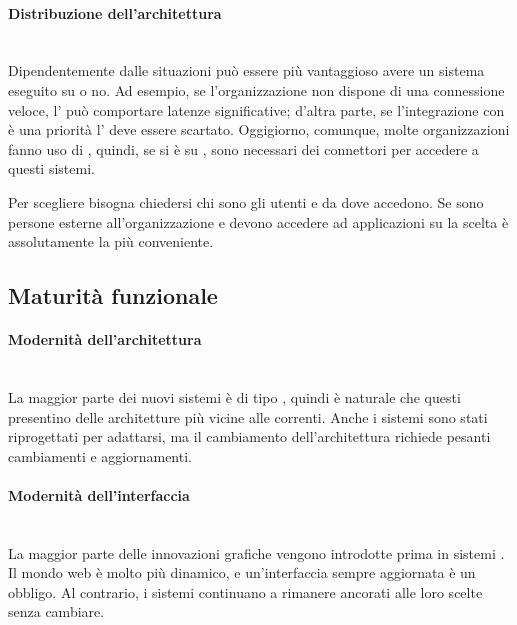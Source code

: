 \paragraph{Distribuzione dell'architettura} \mbox{} \\
Dipendentemente dalle situazioni può essere più vantaggioso avere un sistema eseguito su  o no. Ad esempio, se l'organizzazione non dispone di una connessione veloce, l' può comportare latenze significative; d'altra parte, se l'integrazione con  è una priorità l' deve essere scartato. Oggigiorno, comunque, molte organizzazioni fanno uso di  , quindi, se si è su , sono necessari dei connettori per accedere a questi sistemi.

Per scegliere bisogna chiedersi chi sono gli utenti e da dove accedono. Se sono persone esterne all'organizzazione e devono accedere ad applicazioni su  la scelta  è assolutamente la più conveniente.

\subsection{Maturità funzionale}
\paragraph{Modernità dell'architettura} \mbox{} \\
La maggior parte dei nuovi sistemi  è di tipo , quindi è naturale che questi presentino delle architetture più vicine alle  correnti. Anche i sistemi  sono stati riprogettati per adattarsi, ma il cambiamento dell'architettura richiede pesanti cambiamenti e aggiornamenti.

\paragraph{Modernità dell'interfaccia} \mbox{} \\
La maggior parte delle innovazioni grafiche vengono introdotte prima in sistemi . Il mondo web è molto più dinamico, e un'interfaccia sempre aggiornata è un obbligo. Al contrario, i sistemi  continuano a rimanere ancorati alle loro scelte senza cambiare.

